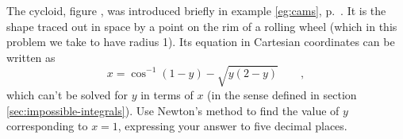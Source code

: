 The cycloid, figure , was introduced briefly in example \ref{eg:cams}, p.~\pageref{eg:cams}.
It is the shape traced out in space by a point on the rim of a rolling wheel (which in this
problem we take to have radius 1).
Its equation in Cartesian coordinates can be written as
\begin{equation*}
  x = \cos^{-1}(1-y)-\sqrt{y(2-y)} \qquad ,
\end{equation*}
which can't be solved for $y$ in terms of $x$ (in the sense defined in section \ref{sec:impossible-integrals}).
Use Newton's method to find the value of $y$ corresponding to $x=1$, expressing your answer to five
decimal places.
\answercheck
